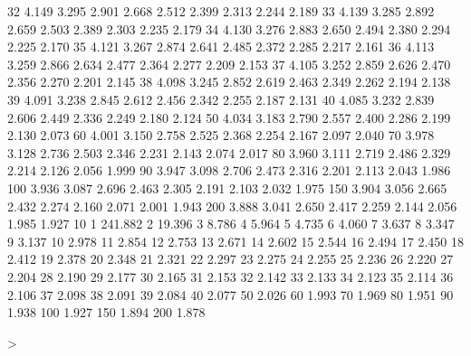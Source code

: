 \documentclass[onecolumn,11pt]{book}
\begin{document}
\begin{Schunk}
\begin{Soutput}
32    4.149   3.295   2.901   2.668   2.512   2.399   2.313   2.244   2.189
33    4.139   3.285   2.892   2.659   2.503   2.389   2.303   2.235   2.179
34    4.130   3.276   2.883   2.650   2.494   2.380   2.294   2.225   2.170
35    4.121   3.267   2.874   2.641   2.485   2.372   2.285   2.217   2.161
36    4.113   3.259   2.866   2.634   2.477   2.364   2.277   2.209   2.153
37    4.105   3.252   2.859   2.626   2.470   2.356   2.270   2.201   2.145
38    4.098   3.245   2.852   2.619   2.463   2.349   2.262   2.194   2.138
39    4.091   3.238   2.845   2.612   2.456   2.342   2.255   2.187   2.131
40    4.085   3.232   2.839   2.606   2.449   2.336   2.249   2.180   2.124
50    4.034   3.183   2.790   2.557   2.400   2.286   2.199   2.130   2.073
60    4.001   3.150   2.758   2.525   2.368   2.254   2.167   2.097   2.040
70    3.978   3.128   2.736   2.503   2.346   2.231   2.143   2.074   2.017
80    3.960   3.111   2.719   2.486   2.329   2.214   2.126   2.056   1.999
90    3.947   3.098   2.706   2.473   2.316   2.201   2.113   2.043   1.986
100   3.936   3.087   2.696   2.463   2.305   2.191   2.103   2.032   1.975
150   3.904   3.056   2.665   2.432   2.274   2.160   2.071   2.001   1.943
200   3.888   3.041   2.650   2.417   2.259   2.144   2.056   1.985   1.927
         10
1   241.882
2    19.396
3     8.786
4     5.964
5     4.735
6     4.060
7     3.637
8     3.347
9     3.137
10    2.978
11    2.854
12    2.753
13    2.671
14    2.602
15    2.544
16    2.494
17    2.450
18    2.412
19    2.378
20    2.348
21    2.321
22    2.297
23    2.275
24    2.255
25    2.236
26    2.220
27    2.204
28    2.190
29    2.177
30    2.165
31    2.153
32    2.142
33    2.133
34    2.123
35    2.114
36    2.106
37    2.098
38    2.091
39    2.084
40    2.077
50    2.026
60    1.993
70    1.969
80    1.951
90    1.938
100   1.927
150   1.894
200   1.878
\end{Soutput}
\begin{Sinput}
>  
\end{Sinput}
\end{Schunk}
 \vfill
\eject
\end{document}
